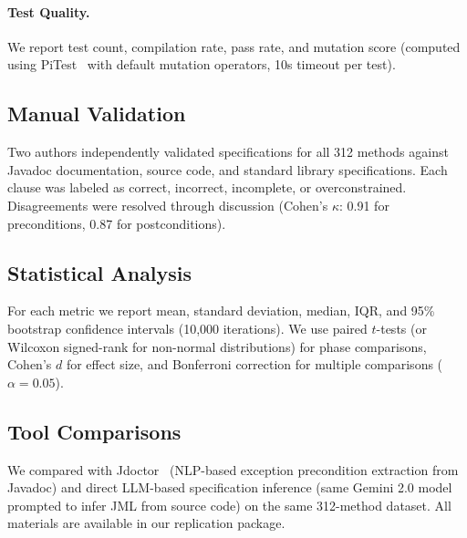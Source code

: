 \paragraph{Test Quality.} We report test count, compilation rate, pass rate, and mutation score (computed using PiTest~\cite{coles2016pitest} with default mutation operators, 10s timeout per test).

\subsection{Manual Validation}

Two authors independently validated specifications for all 312 methods against Javadoc documentation, source code, and standard library specifications. Each clause was labeled as correct, incorrect, incomplete, or overconstrained. Disagreements were resolved through discussion (Cohen's $\kappa$: 0.91 for preconditions, 0.87 for postconditions).

\subsection{Statistical Analysis}

For each metric we report mean, standard deviation, median, IQR, and 95\% bootstrap confidence intervals (10,000 iterations). We use paired $t$-tests (or Wilcoxon signed-rank for non-normal distributions) for phase comparisons, Cohen's $d$ for effect size, and Bonferroni correction for multiple comparisons ($\alpha = 0.05$).

\subsection{Tool Comparisons}

We compared with Jdoctor~\cite{jdoctor2018} (NLP-based exception precondition extraction from Javadoc) and direct LLM-based specification inference (same Gemini 2.0 model prompted to infer JML from source code) on the same 312-method dataset. All materials are available in our replication package.
